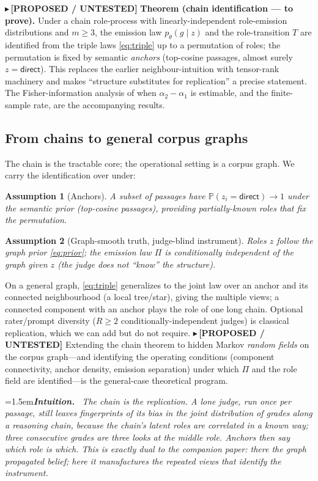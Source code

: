 \documentclass[11pt]{article}
\newtheorem{assumption}{Assumption}
\newcommand{\PROP}[1]{{\color{violet}\small$\blacktriangleright$\,\textbf{[PROPOSED / UNTESTED]} #1}}
\newenvironment{intuition}{\par\smallskip\noindent\hangindent=1.5em\textbf{\itshape Intuition.}\itshape\ \ignorespaces}{\par\smallskip}
\renewcommand{\Pr}{\mathbb{P}}
\begin{document}
\PROP{\textbf{Theorem (chain identification --- to prove).} Under a chain role-process with linearly-independent
role-emission distributions and $m\ge3$, the emission law $p_\theta(g\mid z)$ and the role-transition $T$ are
identified from the triple laws \eqref{eq:triple} up to a permutation of roles; the permutation is fixed by
semantic \emph{anchors} (top-cosine passages, almost surely $z{=}\textsf{direct}$). This replaces the earlier
neighbour-intuition with tensor-rank machinery and makes ``structure substitutes for replication'' a precise
statement. The Fisher-information analysis of when $\alpha_2-\alpha_1$ is estimable, and the finite-sample rate,
are the accompanying results.}

\subsection{From chains to general corpus graphs}
The chain is the tractable core; the operational setting is a corpus graph. We carry the identification over
under:
\begin{assumption}[Anchors]\label{as:anchor}
A subset of passages have $\Pr(z_i{=}\textsf{direct})\to1$ under the semantic prior (top-cosine passages),
providing partially-known roles that fix the permutation.
\end{assumption}
\begin{assumption}[Graph-smooth truth, judge-blind instrument]\label{as:smooth}
Roles $z$ follow the graph prior \eqref{eq:prior}; the emission law $\Pi$ is conditionally independent of the
graph given $z$ (the judge does not ``know'' the structure).
\end{assumption}
On a general graph, \eqref{eq:triple} generalizes to the joint law over an anchor and its connected
neighbourhood (a local tree/star), giving the multiple views; a connected component with an anchor plays the
role of one long chain. Optional rater/prompt diversity ($R\ge2$ conditionally-independent judges) is classical
replication, which we can add but do not require.
\PROP{Extending the chain theorem to hidden Markov \emph{random fields} on the corpus graph---and identifying
the operating conditions (component connectivity, anchor density, emission separation) under which $\Pi$ and the
role field are identified---is the general-case theoretical program.}

\begin{intuition}
The chain \emph{is} the replication. A lone judge, run once per passage, still leaves fingerprints of its bias
in the \emph{joint} distribution of grades along a reasoning chain, because the chain's latent roles are
correlated in a known way; three consecutive grades are three looks at the middle role. Anchors then say which
role is which. This is exactly dual to the companion paper: there the graph propagated \emph{belief}; here it
manufactures the repeated views that \emph{identify the instrument}.
\end{intuition}
\end{document}
